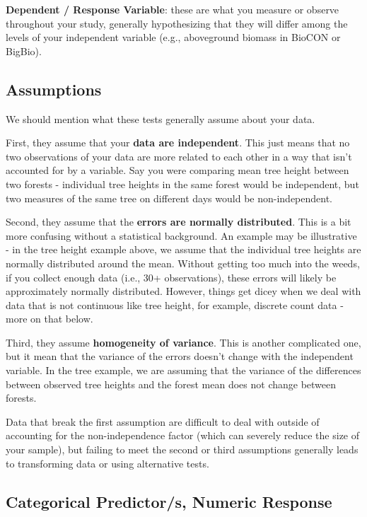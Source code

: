 \documentclass[
  letterpaper,
  DIV=11,
  numbers=noendperiod]{scrreprt}
\begin{document}
\textbf{Dependent / Response Variable}: these are what you measure or
observe throughout your study, generally hypothesizing that they will
differ among the levels of your independent variable (e.g., aboveground
biomass in BioCON or BigBio).

\subsection{Assumptions}\label{assumptions}

We should mention what these tests generally assume about your data.

First, they assume that your \textbf{data are independent}. This just
means that no two observations of your data are more related to each
other in a way that isn't accounted for by a variable. Say you were
comparing mean tree height between two forests - individual tree heights
in the same forest would be independent, but two measures of the same
tree on different days would be non-independent.

Second, they assume that the \textbf{errors are normally distributed}.
This is a bit more confusing without a statistical background. An
example may be illustrative - in the tree height example above, we
assume that the individual tree heights are normally distributed around
the mean. Without getting too much into the weeds, if you collect enough
data (i.e., 30+ observations), these errors will likely be approximately
normally distributed. However, things get dicey when we deal with data
that is not continuous like tree height, for example, discrete count
data - more on that below.

Third, they assume \textbf{homogeneity of variance}. This is another
complicated one, but it mean that the variance of the errors doesn't
change with the independent variable. In the tree example, we are
assuming that the variance of the differences between observed tree
heights and the forest mean does not change between forests.

Data that break the first assumption are difficult to deal with outside
of accounting for the non-independence factor (which can severely reduce
the size of your sample), but failing to meet the second or third
assumptions generally leads to transforming data or using alternative
tests.

\subsection{Categorical Predictor/s, Numeric
Response}\label{categorical-predictors-numeric-response}
\end{document}
